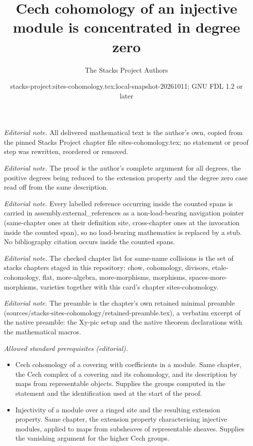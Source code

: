 \documentclass[10pt,a4paper]{amsart}
\title{Cech cohomology of an injective module is concentrated in degree zero}
\author{The Stacks Project Authors}
\date{stacks-project:sites-cohomology.tex:local-snapshot-20261011; GNU FDL 1.2 or later}
\theoremstyle{plain}
\theoremstyle{definition}
\theoremstyle{remark}
\numberwithin{equation}{subsection}
\begin{document}
\maketitle
\noindent\textit{Editorial note.} All delivered mathematical text is the author's own, copied from the pinned Stacks Project chapter file sites-cohomology.tex; no statement or proof step was rewritten, reordered or removed.\par\medskip
\noindent\textit{Editorial note.} The proof is the author's complete argument for all degrees, the positive degrees being reduced to the extension property and the degree zero case read off from the same description.\par\medskip
\noindent\textit{Editorial note.} Every labelled reference occurring inside the counted spans is carried in assembly.external\_references as a non-load-bearing navigation pointer (same-chapter ones at their definition site, cross-chapter ones at the invocation inside the counted span), so no load-bearing mathematics is replaced by a stub. No bibliography citation occurs inside the counted spans.\par\medskip
\noindent\textit{Editorial note.} The checked chapter list for same-name collisions is the set of stacks chapters staged in this repository: chow, cohomology, divisors, etale-cohomology, flat, more-algebra, more-morphisms, morphisms, spaces-more-morphisms, varieties together with this card's chapter sites-cohomology.\par\medskip
\noindent\textit{Editorial note.} The preamble is the chapter's own retained minimal preamble (sources/stacks-sites-cohomology/retained-preamble.tex), a verbatim excerpt of the native preamble: the Xy-pic setup and the native theorem declarations with the mathematical macros.\par\medskip
\noindent\textit{Allowed standard prerequisites (editorial).}\begin{itemize}
\item Cech cohomology of a covering with coefficients in a module. Same chapter, the Cech complex of a covering and its cohomology, and its description by maps from representable objects. Supplies the groups computed in the statement and the identification used at the start of the proof.
\item Injectivity of a module over a ringed site and the resulting extension property. Same chapter, the extension property characterising injective modules, applied to maps from subsheaves of representable sheaves. Supplies the vanishing argument for the higher Cech groups.
\end{itemize}\medskip
\end{document}
